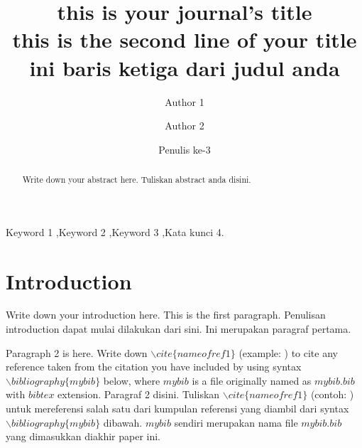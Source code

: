\documentclass[preprint]{elsarticle}
\begin{document}
\begin{frontmatter}

\title{
	this is your journal's title \\ %
	this is the second line of your title \\
	ini baris ketiga dari judul anda
}

\author[label1]{Author 1} 

\author[label1,label2]{Author 2} %

\author[label2]{Penulis ke-3}

\address[label1]{The name of university 1, including the related department}

\address[label2]{The name of university 2, including the related department}

\begin{abstract}
Write down your abstract here. Tuliskan abstract anda disini.
\end{abstract}

\begin{keyword}
Keyword 1 \sep Keyword 2 \sep Keyword 3 \sep Kata kunci 4. %
\end{keyword}

\end{frontmatter}


\section{Introduction}

Write down your introduction here. This is the first paragraph. Penulisan introduction dapat mulai dilakukan dari sini. Ini merupakan paragraf pertama.

\vfill
Paragraph 2 is here. Write down $\backslash cite\{nameofref1\}$ (example: \cite{nameofref1}) to cite any reference taken from the citation you have included by using syntax $\backslash bibliography\{mybib\}$ below, where $mybib$ is a file originally named as $mybib.bib$ with $bibtex$ extension. Paragraf 2 disini. Tuliskan $\backslash cite\{nameofref1\}$ (contoh: \cite{nameofref1}) untuk mereferensi salah satu dari kumpulan referensi yang diambil dari syntax $\backslash bibliography\{mybib\}$ dibawah. $mybib$ sendiri merupakan nama file $mybib.bib$ yang dimasukkan diakhir paper ini. 
\end{document}

